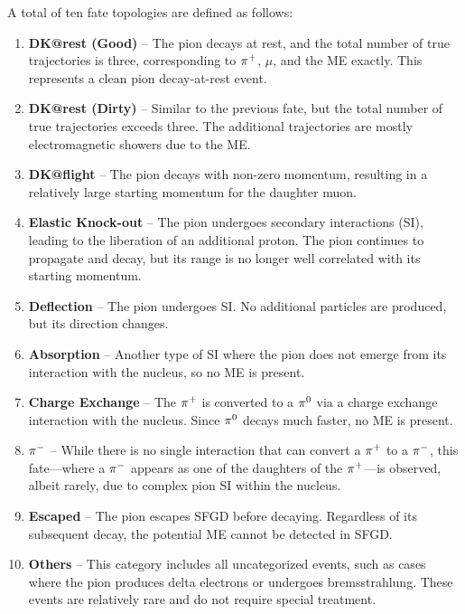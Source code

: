           A total of ten fate topologies are defined as follows:
          \begin{enumerate}
          \item \textbf{DK@rest (Good)} – The pion decays at rest, and the total number of true trajectories is three, corresponding to $\pi^+$, $\mu$, and the ME exactly. 
          This represents a clean pion decay-at-rest event.
          \item \textbf{DK@rest (Dirty)} – Similar to the previous fate, but the total number of true trajectories exceeds three. 
          The additional trajectories are mostly electromagnetic showers due to the ME.
          \item \textbf{DK@flight} – The pion decays with non-zero momentum, resulting in a relatively large starting momentum for the daughter muon.
          \item \textbf{Elastic Knock-out} – The pion undergoes secondary interactions (SI), leading to the liberation of an additional proton. 
          The pion continues to propagate and decay, but its range is no longer well correlated with its starting momentum.
          \item \textbf{Deflection} – The pion undergoes SI. 
          No additional particles are produced, but its direction changes.
          \item \textbf{Absorption} – Another type of SI where the pion does not emerge from its interaction with the nucleus, so no ME is present.
          \item \textbf{Charge Exchange} – The $\pi^+$ is converted to a $\pi^0$ via a charge exchange interaction with the nucleus. 
          Since $\pi^0$ decays much faster, no ME is present.
          \item \textbf{$\pi^-$} – While there is no single interaction that can convert a $\pi^+$ to a $\pi^-$, this fate—where a $\pi^-$ appears as one of the daughters of the $\pi^+$—is observed, albeit rarely, due to complex pion SI within the nucleus.
          \item \textbf{Escaped} – The pion escapes SFGD before decaying. 
          Regardless of its subsequent decay, the potential ME cannot be detected in SFGD.
          \item \textbf{Others} – This category includes all uncategorized events, such as cases where the pion produces delta electrons or undergoes bremsstrahlung. 
          These events are relatively rare and do not require special treatment.
          \end{enumerate}

